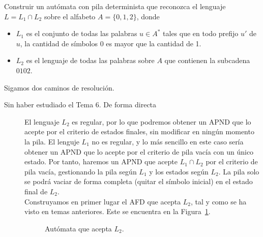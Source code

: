 \begin{ejercicio}\label{ej:1.5.15}
    Construir un autómata con pila determinista que reconozca el lenguaje $L=L_1\cap L_2$ sobre el alfabeto $A = \{0,1,2\}$, donde
    \begin{itemize}
        \item $L_1$ es el conjunto de todas las palabras $u\in A^\ast$ tales que en todo prefijo $u'$ de $u$, la cantidad de símbolos 0 es mayor que la cantidad de 1.
        \item $L_2$ es el lenguaje de todas las palabras sobre $A$ que contienen la subcadena $0102$.
    \end{itemize}

    Sigamos dos caminos de resolución.
    \begin{description}
        \item[Sin haber estudiado el Tema 6. De forma directa]
        
        El lenguaje $L_2$ es regular, por lo que podremos obtener un APND que lo acepte por el criterio de estados finales, sin modificar en ningún momento la pila. El lenguje $L_1$ no es regular, y lo más sencillo en este caso sería obtener un APND que lo acepte por el criterio de pila vacía con un único estado. Por tanto, haremos un APND que acepte $L_1\cap L_2$ por el criterio de pila vacía, gestionando la pila según $L_1$ y los estados según $L_2$. La pila solo se podrá vaciar de forma completa (quitar el símbolo inicial) en el estado final de $L_2$.\\

        Construyamos en primer lugar el AFD que acepta $L_2$, tal y como se ha visto en temas anteriores. Este se encuentra en la Figura~\ref{fig:1.5.15-1}.
        \begin{figure}
            \centering
            \caption{Autómata que acepta $L_2$.}
            \label{fig:1.5.15-1}
        \end{figure}


\end{description}
\end{ejercicio}
